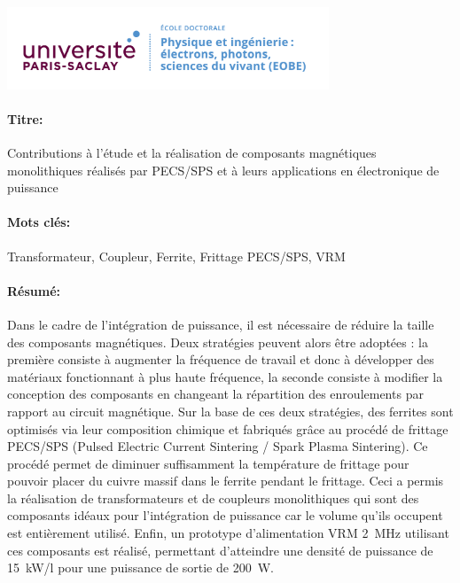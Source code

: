 \documentclass[12pt,a4paper]{book}
\begin{document}
\lhead{}
\rhead{}
\rfoot{}
\cfoot{}
\lfoot{}

\noindent 
\includegraphics[height=2.45cm]{EOBE}
\vspace{1cm}

\begin{mdframed}[linecolor=Prune,linewidth=1]
\vspace{-.25cm}
\paragraph*{Titre:} Contributions à l'étude et la réalisation de composants magnétiques monolithiques réalisés par PECS/SPS et à leurs applications en électronique de puissance

\begin{small}
\vspace{-.25cm}
\paragraph*{Mots clés:} Transformateur, Coupleur, Ferrite, Frittage PECS/SPS, VRM

\vspace{-.5cm}
\begin{multicols}{2}
\paragraph*{Résumé:} Dans le cadre de l'intégration de puissance, il est nécessaire de réduire la taille des composants magnétiques. Deux stratégies peuvent alors être adoptées : la première consiste à augmenter la fréquence de travail et donc à développer des matériaux fonctionnant à plus haute fréquence, la seconde consiste à modifier la conception des composants en changeant la répartition des enroulements par rapport au circuit magnétique. Sur la base de ces deux stratégies, des ferrites sont optimisés via leur composition chimique et fabriqués grâce au procédé de frittage PECS/SPS (Pulsed Electric Current Sintering / Spark Plasma Sintering). Ce procédé permet de diminuer suffisamment la température de frittage pour pouvoir placer du cuivre massif dans le ferrite pendant le frittage. Ceci a permis la réalisation de transformateurs et de coupleurs monolithiques qui sont des composants idéaux pour l'intégration de puissance car le volume qu'ils occupent est entièrement utilisé. Enfin, un prototype d'alimentation VRM 2~MHz utilisant ces composants est réalisé, permettant d'atteindre une densité de puissance de 15~kW/l pour une puissance de sortie de 200~W.
\end{multicols}
\end{small}
\end{mdframed}
\end{document}
